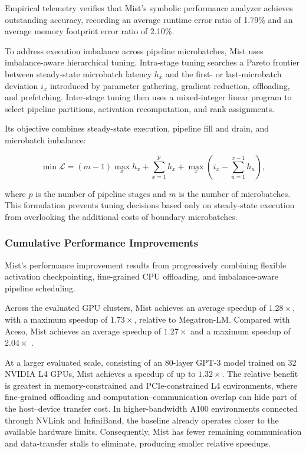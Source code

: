 \documentclass[11pt,journal,final, onecolumn]{IEEEtran}
\begin{document}
Empirical telemetry verifies that Mist's symbolic performance analyzer achieves outstanding accuracy, recording an average runtime error ratio of 1.79\% and an average memory footprint error ratio of 2.10\%.

To address execution imbalance across pipeline microbatches, Mist uses
imbalance-aware hierarchical tuning. Intra-stage tuning searches a Pareto
frontier between steady-state microbatch latency \(h_x\) and the first- or
last-microbatch deviation \(i_x\) introduced by parameter gathering, gradient
reduction, offloading, and prefetching. Inter-stage tuning then uses a
mixed-integer linear program to select pipeline partitions, activation
recomputation, and rank assignments.

Its objective combines steady-state execution, pipeline fill and drain, and
microbatch imbalance:

\[
    \min \mathcal{L}
    =
    (m-1)\max_x h_x
    + \sum_{x=1}^{p} h_x
    + \max_x
    \left(
    i_x-\sum_{u=1}^{x-1}h_u
    \right),
\]

where \(p\) is the number of pipeline stages and \(m\) is the number of
microbatches. This formulation prevents tuning decisions based only on
steady-state execution from overlooking the additional costs of boundary
microbatches.

\subsubsection{Cumulative Performance Improvements}
\label{subsubsec:mist-speedup-breakdown}

Mist's performance improvement results from progressively combining flexible
activation checkpointing, fine-grained CPU offloading, and
imbalance-aware pipeline scheduling.

Across the evaluated GPU clusters, Mist achieves an average speedup of
\(\mathbf{1.28\times}\), with a maximum speedup of
\(\mathbf{1.73\times}\), relative to Megatron-LM. Compared with Aceso, Mist
achieves an average speedup of \(\mathbf{1.27\times}\) and a maximum speedup
of \(\mathbf{2.04\times}\) \cite{Zhu_2025}.

At a larger evaluated scale, consisting of an 80-layer GPT-3 model trained on
32 NVIDIA L4 GPUs, Mist achieves a speedup of up to
\(\mathbf{1.32\times}\). The relative benefit is greatest in
memory-constrained and PCIe-constrained L4 environments, where fine-grained
offloading and computation--communication overlap can hide part of the
host--device transfer cost. In higher-bandwidth A100 environments connected
through NVLink and InfiniBand, the baseline already operates closer to the
available hardware limits. Consequently, Mist has fewer remaining
communication and data-transfer stalls to eliminate, producing smaller
relative speedups.
\end{document}

